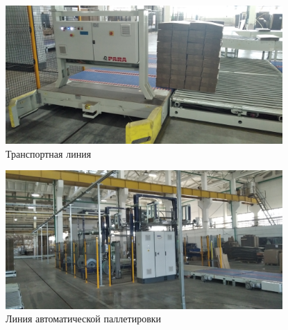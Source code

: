 \begin{figure}
\begin{center}
  \includegraphics[height=0.94\textheight, width=0.94\textwidth, keepaspectratio]{Pics 1/7 перемещение паллет.jpg}
\end{center}
  \caption{Транспортная линия}
  \label{pic:7 перемещение паллет}
\end{figure}


\begin{figure}
\begin{center}
  \includegraphics[height=0.94\textheight, width=0.94\textwidth, keepaspectratio]{Pics 1/7 Паллетировка.jpg}
\end{center}
  \caption{Линия автоматической паллетировки}
  \label{pic:7 Паллетировка}
\end{figure}

